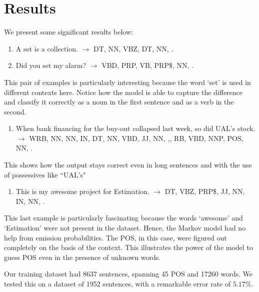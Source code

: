 \documentclass[11pt]{article}
\begin{document}
\section{Results}
We present some significant results below:
\begin{enumerate}
\item A set is a collection. $\rightarrow$ {DT, NN, VBZ, DT, NN, .}
\item Did you set my alarm? $\rightarrow$ {VBD, PRP, VB, PRP\$, NN, .}
\end{enumerate}
%
This pair of examples is particularly interesting because the word `set' is used in different contexts here. Notice how the model is able to capture the difference and classify it correctly as a noun in the first sentence and as a verb in the second.
%
\begin{enumerate}[resume]
\item When bank financing for the buy-out collapsed last week, so did UAL's stock. $\rightarrow$ {WRB, NN, NN, IN, DT, NN, VBD, JJ, NN, ,, RB, VBD, NNP, POS, NN, .}
\end{enumerate}
%
This shows how the output stays correct even in long sentences and with the use of possessives like ``UAL's"
%
\begin{enumerate}[resume]
\item This is my awesome project for Estimation. $\rightarrow$ {DT, VBZ, PRP\$, JJ, NN, IN, NN, .}
\end{enumerate}
%
This last example is particularly fascinating because the words `awesome' and `Estimation' were not present in the dataset. Hence, the Markov model had no help from emission probabilities. The POS, in this case, were figured out completely on the basis of the context. This illustrates the power of the model to guess POS even in the presence of unknown words.

Our training dataset had 8637 sentences, spanning 45 POS and 17260 words. We tested this on a dataset of 1952 sentences, with a remarkable error rate of $5.17\%$.
\end{document}
